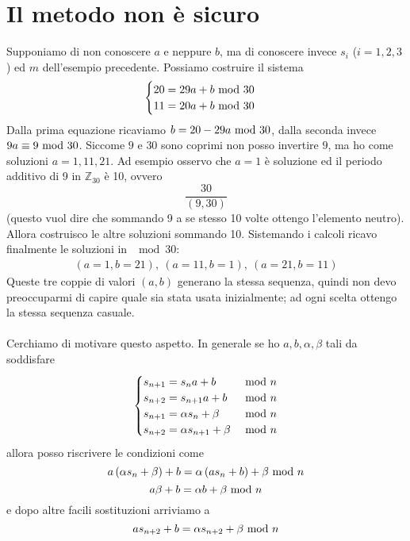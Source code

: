 \section{Il metodo non è sicuro}

	Supponiamo di non conoscere $a$ e neppure $b$, ma di conoscere invece $s_i$ ($i=1,2,3$) ed $m$ dell'esempio precedente. Possiamo costruire il sistema
	\begin{equation*}
	\begin{cases}
	20 =29a+b\ \mathrm{mod}\ 30\\
	11=20a+b\ \mathrm{mod}\ 30
	\end{cases}
	\end{equation*}
	Dalla prima equazione ricaviamo $b=20-29a\ \mathrm{mod}\ 30$, dalla seconda invece $9a\equiv9\ \mathrm{mod}\ 30$. Siccome $9$ e $30$ sono coprimi non posso invertire $9$, ma ho come soluzioni $a=1,11,21$. Ad esempio osservo che $a=1$ è soluzione ed il periodo additivo di 9 in $\mathbb{Z}_{30}$ è 10, ovvero 
	\begin{equation*}
	\frac{30}{(9,30)}
	\end{equation*}
	(questo vuol dire che sommando 9 a se stesso 10 volte ottengo l'elemento neutro). Allora costruisco le altre soluzioni sommando 10. Sistemando i calcoli ricavo finalmente le soluzioni in $\mod30$:
	\begin{align*}
	(a=1,b=21), \ (a=11, b=1), \ (a=21, b=11)
	\end{align*}
	Queste tre coppie di valori $(a,b)$ generano la stessa sequenza, quindi non devo preoccuparmi di capire quale sia stata usata inizialmente; ad ogni scelta ottengo la stessa sequenza casuale. \\ \\ Cerchiamo di motivare questo aspetto. In generale se ho $a,b,\alpha,\beta$ tali da soddisfare
	\begin{equation*}
	\begin{cases}
	s_{n+1} =s_na+b & \ \mathrm{mod}\ n\\
	s_{n+2}=s_{n+1}a+b & \ \mathrm{mod}\ n\\
	s_{n+1}=\alpha s_n+\beta & \ \mathrm{mod}\ n\\
	s_{n+2}=\alpha s_{n+1}+\beta & \ \mathrm{mod}\ n
	\end{cases}
	\end{equation*}
	allora posso riscrivere le condizioni come
	\begin{equation*}
	a\left(\alpha s_n+\beta\right)+b=\alpha\left(as_n+b\right)+\beta \ \mathrm{mod}\ n
	\end{equation*}
	\begin{equation*}
	a\beta+b=\alpha b+\beta\ \mathrm{mod}\ n
	\end{equation*}
	e dopo altre facili sostituzioni arriviamo a 
	\begin{equation*}
	as_{n+2}+b=\alpha s_{n+2}+\beta \ \mathrm{mod}\ n
	\end{equation*}
	
